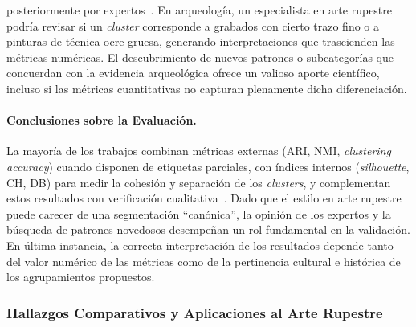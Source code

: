 posteriormente por expertos~\cite{dangeti2024}. En arqueología, un especialista en arte rupestre podría revisar si un \textit{cluster} corresponde a grabados con cierto trazo fino o a pinturas de técnica ocre gruesa, generando interpretaciones que trascienden las métricas numéricas. El descubrimiento de nuevos patrones o subcategorías que concuerdan con la evidencia arqueológica ofrece un valioso aporte científico, incluso si las métricas cuantitativas no capturan plenamente dicha diferenciación. \paragraph{Conclusiones sobre la Evaluación.} La mayoría de los trabajos combinan métricas externas (ARI, NMI, \textit{clustering accuracy}) cuando disponen de etiquetas parciales, con índices internos (\textit{silhouette}, CH, DB) para medir la cohesión y separación de los \textit{clusters}, y complementan estos resultados con verificación cualitativa~\cite{guerin2018,dangeti2024}. Dado que el estilo en arte rupestre puede carecer de una segmentación “canónica”, la opinión de los expertos y la búsqueda de patrones novedosos desempeñan un rol fundamental en la validación. En última instancia, la correcta interpretación de los resultados depende tanto del valor numérico de las métricas como de la pertinencia cultural e histórica de los agrupamientos propuestos.

\subsubsection{Hallazgos Comparativos y Aplicaciones al Arte Rupestre}

